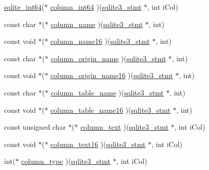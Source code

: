 \begin{DoxyCompactItemize}
\hyperlink{sqlite3_8h_a520a95f9080c018b2fade39885bd2e2a}{sqlite\+\_\+int64}($\ast$ \hyperlink{structsqlite3__api__routines_a6992d17196cce6a9c893df0e69ea8b17}{column\+\_\+int64} )(\hyperlink{sqlite3_8h_af2a033da1327cdd77f0a174a09aedd0c}{sqlite3\+\_\+stmt} $\ast$, int i\+Col)
\item 
const char $\ast$($\ast$ \hyperlink{structsqlite3__api__routines_a8ae08c78d80fae61c0abeb80a7cd70f5}{column\+\_\+name} )(\hyperlink{sqlite3_8h_af2a033da1327cdd77f0a174a09aedd0c}{sqlite3\+\_\+stmt} $\ast$, int)
\item 
const void $\ast$($\ast$ \hyperlink{structsqlite3__api__routines_a14ff9b029639553e11e610281097dfc7}{column\+\_\+name16} )(\hyperlink{sqlite3_8h_af2a033da1327cdd77f0a174a09aedd0c}{sqlite3\+\_\+stmt} $\ast$, int)
\item 
const char $\ast$($\ast$ \hyperlink{structsqlite3__api__routines_a944609a2b514a9002e3c76575ad3bd65}{column\+\_\+origin\+\_\+name} )(\hyperlink{sqlite3_8h_af2a033da1327cdd77f0a174a09aedd0c}{sqlite3\+\_\+stmt} $\ast$, int)
\item 
const void $\ast$($\ast$ \hyperlink{structsqlite3__api__routines_a29f148c32e2e8aba50d3ff3ffd8c4f90}{column\+\_\+origin\+\_\+name16} )(\hyperlink{sqlite3_8h_af2a033da1327cdd77f0a174a09aedd0c}{sqlite3\+\_\+stmt} $\ast$, int)
\item 
const char $\ast$($\ast$ \hyperlink{structsqlite3__api__routines_a06525d1223f774274ff49b287d33a952}{column\+\_\+table\+\_\+name} )(\hyperlink{sqlite3_8h_af2a033da1327cdd77f0a174a09aedd0c}{sqlite3\+\_\+stmt} $\ast$, int)
\item 
const void $\ast$($\ast$ \hyperlink{structsqlite3__api__routines_a3252c82d0f2ed7e88a76f26585d13bbb}{column\+\_\+table\+\_\+name16} )(\hyperlink{sqlite3_8h_af2a033da1327cdd77f0a174a09aedd0c}{sqlite3\+\_\+stmt} $\ast$, int)
\item 
const unsigned char $\ast$($\ast$ \hyperlink{structsqlite3__api__routines_ae9bb95b6e37236693ca5ec51598c7908}{column\+\_\+text} )(\hyperlink{sqlite3_8h_af2a033da1327cdd77f0a174a09aedd0c}{sqlite3\+\_\+stmt} $\ast$, int i\+Col)
\item 
const void $\ast$($\ast$ \hyperlink{structsqlite3__api__routines_a952f4680bde7ff3af3ada148380ec08e}{column\+\_\+text16} )(\hyperlink{sqlite3_8h_af2a033da1327cdd77f0a174a09aedd0c}{sqlite3\+\_\+stmt} $\ast$, int i\+Col)
\item 
int($\ast$ \hyperlink{structsqlite3__api__routines_a1381e48828398ae738aa2416d2e4feb9}{column\+\_\+type} )(\hyperlink{sqlite3_8h_af2a033da1327cdd77f0a174a09aedd0c}{sqlite3\+\_\+stmt} $\ast$, int i\+Col)

\end{DoxyCompactItemize}
